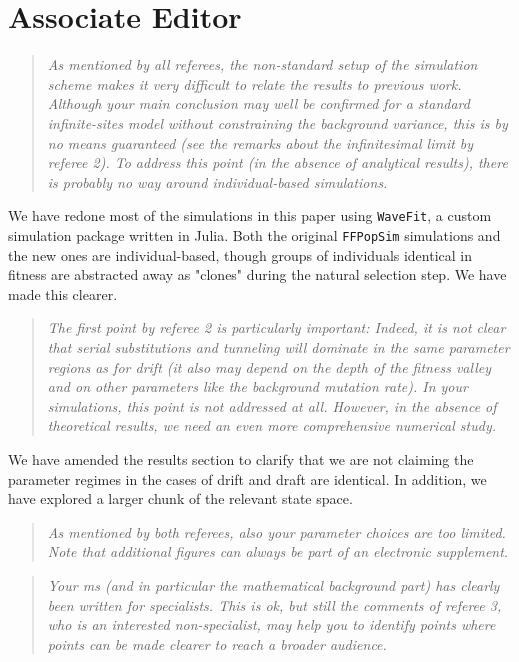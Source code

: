 \documentclass[11pt]{article}
\newenvironment{reviewerquote}{\begin{quote}\color{black}\itshape}{\end{quote}}
\begin{document}
\section*{Associate Editor}

\begin{reviewerquote}
As mentioned by all referees, the non-standard setup of the simulation scheme makes it very difficult to relate the results to previous work. Although your main conclusion may well be confirmed for a standard infinite-sites model without constraining the background variance, this is by no means guaranteed (see the remarks about the infinitesimal limit by referee 2). To address this point (in the absence of analytical results), there is probably no way around individual-based simulations.
\end{reviewerquote}

We have redone most of the simulations in this paper using \texttt{WaveFit}, a custom simulation package written in Julia. Both the original \texttt{FFPopSim} simulations and the new ones are individual-based, though groups of individuals identical in fitness are abstracted away as "clones" during the natural selection step. We have made this clearer.

\begin{reviewerquote}
The first point by referee 2 is particularly important: Indeed, it is not clear that serial substitutions and tunneling will dominate in the same parameter regions as for drift (it also may depend on the depth of the fitness valley and on other parameters like the background mutation rate). In your simulations, this point is not addressed at all. However, in the absence of theoretical results, we need an even more comprehensive numerical study.
\end{reviewerquote}

We have amended the results section to clarify that we are not claiming the parameter regimes in the cases of drift and draft are identical. In addition, we have explored a larger chunk of the relevant state space.

\begin{reviewerquote}
As mentioned by both referees, also your parameter choices are too limited. Note that additional figures can always be part of an electronic supplement.
\end{reviewerquote}

\begin{reviewerquote}
Your ms (and in particular the mathematical background part) has clearly been written for specialists. This is ok, but still the comments of referee 3, who is an interested non-specialist, may help you to identify points where points can be made clearer to reach a broader audience.
\end{reviewerquote}
\end{document}
